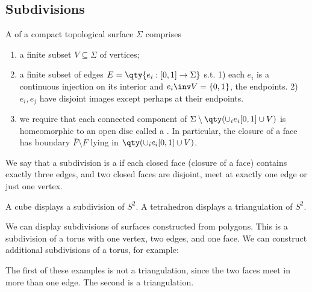 \subsection{Subdivisions}

\begin{definition}[Subdivision]
	A  of a compact topological surface $\Sigma$ comprises
	\begin{enumerate}
		\item a finite subset $V \subseteq \Sigma$ of vertices;
		\item a finite subset of edges $E = \qty{e_i : [0,1] \to \Sigma}$ s.t. 1) each $e_i$ is a continuous injection on its interior and $e_i\inv V = \{0, 1\}$, the endpoints.
		2) $e_i, e_j$ have disjoint images except perhaps at their endpoints.
		\item we require that each connected component of $\Sigma \setminus \qty(\cup_i e_i [0, 1] \cup V)$ is homeomorphic to an open disc called a .
		      In particular, the closure of a face has boundary $\overline F \setminus F$ lying in $\qty(\cup_i e_i [0, 1] \cup V)$.
	\end{enumerate}
\end{definition}

\begin{definition}[Triangulation]
	We say that a subdivision is a  if each closed face (closure of a face) contains exactly three edges, and two closed faces are disjoint, meet at exactly one edge or just one vertex.
\end{definition} 

\begin{example}
	A cube displays a subdivision of $S^2$.
	A tetrahedron displays a triangulation of $S^2$.
\end{example}

\begin{example}
	We can display subdivisions of surfaces constructed from polygons.
	This is a subdivision of a torus with one vertex, two edges, and one face.
	We can construct additional subdivisions of a torus, for example:
	\begin{center}
		 \quad {}
	\end{center}
	The first of these examples is not a triangulation, since the two faces meet in more than one edge.
	The second is a triangulation.
\end{example}

